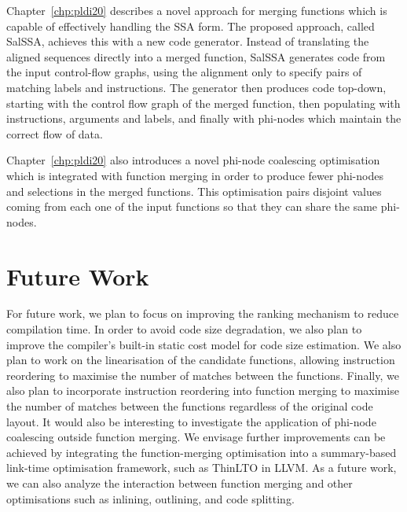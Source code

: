 Chapter~\ref{chp:pldi20} describes a novel approach for merging functions which is capable of effectively handling the SSA form.
The proposed approach, called SalSSA, achieves this with a new code generator.
Instead of translating the aligned sequences directly into a merged function, SalSSA generates code from the input control-flow graphs, using the alignment only to specify pairs of matching labels and instructions.
The generator then produces code top-down, starting with the control flow graph of the merged function, then populating with instructions, arguments and labels, and finally with phi-nodes which maintain the correct flow of data.

Chapter~\ref{chp:pldi20} also introduces a novel phi-node coalescing optimisation which is integrated with function merging in order to produce fewer phi-nodes and selections in the merged functions.
This optimisation pairs disjoint values coming from each one of the input functions so that they can share the same phi-nodes.




\section{Future Work} \label{sec:conclusion:futurework}

For future work, we plan to focus on improving the ranking mechanism to reduce compilation time.
In order to avoid code size degradation, we also plan to improve the compiler's built-in static cost model for code size estimation.
We also plan to work on the linearisation of the candidate functions, allowing instruction reordering to maximise the number of matches between the functions.
Finally, we also plan to incorporate instruction reordering into function merging to maximise the number of matches between the functions regardless of the original code layout.
It would also be interesting to investigate the application of phi-node coalescing outside function merging.
We envisage further improvements can be achieved by integrating the function-merging optimisation into a summary-based  link-time optimisation framework, such as ThinLTO in LLVM.
As a future work, we can also analyze the interaction between function merging and other optimisations such as inlining, outlining, and code splitting.

